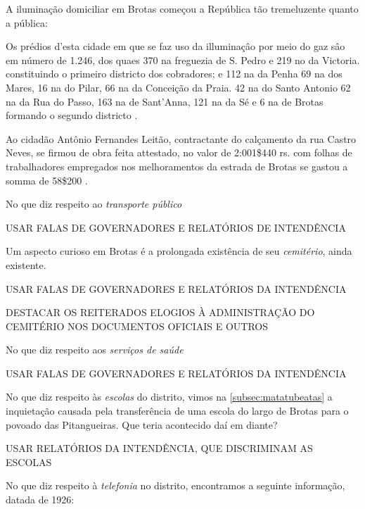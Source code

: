 A iluminação domiciliar em Brotas começou a República tão tremeluzente quanto a pública:

\begin{citacao}
Os prédios d'esta cidade em que se faz uso da illuminaçâo por meio do gaz sâo em número de 1.246, dos quaes 370 na freguezia de S. Pedro e 219 no da Victoria. constituindo o primeiro districto dos cobradores; e 112 na da Penha 69 na dos Mares, 16 na do Pilar, 66 na da Conceição da Praia. 42 na do Santo Antonio 62 na da Rua do Passo, 163 na de Sant'Anna, 121 na da Sé e 6 na de Brotas formando o segundo districto \cite[p.~151]{salvador_relatorio_1896}. 
\end{citacao}

\begin{citacao}
Ao cidadão Antônio Fernandes Leitão, contractante do calçamento da rua Castro Neves, se firmou de obra feita attestado, no valor de 2:001\$440 rs. com folhas de trabalhadores empregados nos melhoramentos da estrada de Brotas se gastou a somma de 58\$200 \cite[p.~]{salvador_relatorio_1896}.
\end{citacao}



No que diz respeito ao \textit{transporte público}

USAR FALAS DE GOVERNADORES E RELATÓRIOS DE INTENDÊNCIA

Um aspecto curioso em Brotas é a prolongada existência de seu \textit{cemitério}, ainda existente.

USAR FALAS DE GOVERNADORES E RELATÓRIOS DA INTENDÊNCIA

DESTACAR OS REITERADOS ELOGIOS À ADMINISTRAÇÃO DO CEMITÉRIO NOS DOCUMENTOS OFICIAIS E OUTROS

No que diz respeito aos \textit{serviços de saúde}

USAR FALAS DE GOVERNADORES E RELATÓRIOS DA INTENDÊNCIA

No que diz respeito às \textit{escolas} do distrito, vimos na \autoref{subsec:matatubeatas} a inquietação causada pela transferência de uma escola do largo de Brotas para o povoado das Pitangueiras. Que teria acontecido daí em diante?



USAR RELATÓRIOS DA INTENDÊNCIA, QUE DISCRIMINAM AS ESCOLAS

No que diz respeito à \textit{telefonia} no distrito, encontramos a seguinte informação, datada de 1926:

